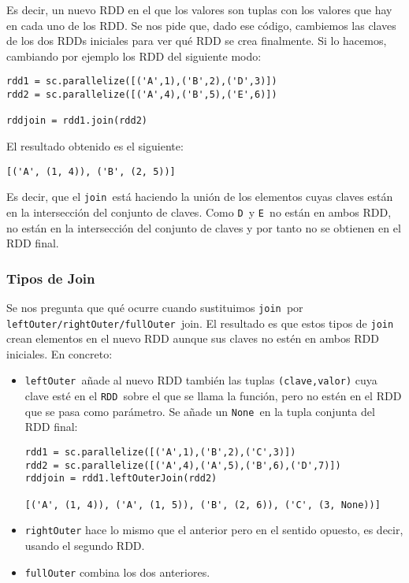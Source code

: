 \documentclass[11pt]{article}
\def\inline{\lstinline[basicstyle=\ttfamily,keywordstyle={}]}
\begin{document}
Es decir, un nuevo RDD en el que los valores son tuplas con los valores que hay en cada uno de los RDD. Se nos pide que, dado ese código, cambiemos las claves de los dos RDDs iniciales para ver qué RDD se crea finalmente. Si lo hacemos, cambiando por ejemplo los RDD del siguiente modo:
\begin{verbatim}
rdd1 = sc.parallelize([('A',1),('B',2),('D',3)])
rdd2 = sc.parallelize([('A',4),('B',5),('E',6)])

rddjoin = rdd1.join(rdd2)
\end{verbatim}
El resultado obtenido es el siguiente:
\begin{verbatim}
[('A', (1, 4)), ('B', (2, 5))]
\end{verbatim}
Es decir, que el \inline{join }está haciendo la unión de los elementos cuyas claves están en la intersección del conjunto de claves. Como \inline{D }y \inline{E }no están en ambos RDD, no están en la intersección del conjunto de claves y por tanto no se obtienen en el RDD final.

\subsubsection*{ Tipos de Join }

Se nos pregunta que qué ocurre cuando sustituimos \inline{join }por \inline{leftOuter/rightOuter/fullOuter }join. El resultado es que estos tipos de \inline{join }crean elementos en el nuevo RDD aunque sus claves no estén en ambos RDD iniciales. En concreto:
\begin{itemize}
\item  \inline{leftOuter }añade al nuevo RDD también las tuplas  \inline{(clave,valor)} cuya clave esté en el \inline{RDD }sobre el que se llama la función, pero no estén en el RDD que se pasa como parámetro. Se añade un \inline{None }en la tupla conjunta del RDD final:
\begin{verbatim}
rdd1 = sc.parallelize([('A',1),('B',2),('C',3)])
rdd2 = sc.parallelize([('A',4),('A',5),('B',6),('D',7)])
rddjoin = rdd1.leftOuterJoin(rdd2)

[('A', (1, 4)), ('A', (1, 5)), ('B', (2, 6)), ('C', (3, None))]
\end{verbatim}

\item  \inline{rightOuter} hace lo mismo que el anterior pero en el sentido opuesto, es decir, usando el segundo RDD.
\item  \inline{fullOuter} combina los dos anteriores.

\end{itemize}
\end{document}
